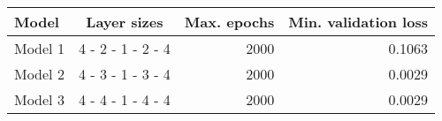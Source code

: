 \begin{tabular}{lcrr}
\toprule
 Model   &    Layer sizes    &   Max. epochs &   Min. validation loss \\
\midrule
 Model 1 & 4 - 2 - 1 - 2 - 4 &          2000 &                 0.1063 \\
 Model 2 & 4 - 3 - 1 - 3 - 4 &          2000 &                 0.0029 \\
 Model 3 & 4 - 4 - 1 - 4 - 4 &          2000 &                 0.0029 \\
\bottomrule
\end{tabular}